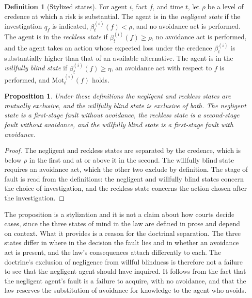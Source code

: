 \documentclass[11pt]{article}
\theoremstyle{plain}
\newtheorem{proposition}{Proposition}
\theoremstyle{definition}
\newtheorem{definition}{Definition}
\begin{document}
\begin{definition}[Stylized states]
For agent $i$, fact $f$, and time $t$, let $\rho$ be a level of credence at which a risk is substantial. The agent is in the \emph{negligent state} if the investigation $q_f$ is indicated, $\beta^{(i)}_t(f)<\rho$, and no avoidance act is performed. The agent is in the \emph{reckless state} if $\beta^{(i)}_t(f)\ge\rho$, no avoidance act is performed, and the agent takes an action whose expected loss under the credence $\beta^{(i)}_t$ is substantially higher than that of an available alternative. The agent is in the \emph{willfully blind state} if $\beta^{(i)}_t(f)\ge\eta$, an avoidance act with respect to $f$ is performed, and $\mathrm{Mot}^{(i)}_t(f)$ holds.
\end{definition}

\begin{proposition}\label{prop:states}
Under these definitions the negligent and reckless states are mutually exclusive, and the willfully blind state is exclusive of both. The negligent state is a first-stage fault without avoidance, the reckless state is a second-stage fault without avoidance, and the willfully blind state is a first-stage fault with avoidance.
\end{proposition}

\begin{proof}
The negligent and reckless states are separated by the credence, which is below $\rho$ in the first and at or above it in the second. The willfully blind state requires an avoidance act, which the other two exclude by definition. The stage of fault is read from the definitions: the negligent and willfully blind states concern the choice of investigation, and the reckless state concerns the action chosen after the investigation.
\end{proof}

The proposition is a stylization and it is not a claim about how courts decide cases, since the three states of mind in the law are defined in prose and depend on context. What it provides is a reason for the doctrinal separation. The three states differ in where in the decision the fault lies and in whether an avoidance act is present, and the law's consequences attach differently to each. The doctrine's exclusion of negligence from willful blindness is therefore not a failure to see that the negligent agent should have inquired. It follows from the fact that the negligent agent's fault is a failure to acquire, with no avoidance, and that the law reserves the substitution of avoidance for knowledge to the agent who avoids.
\end{document}
